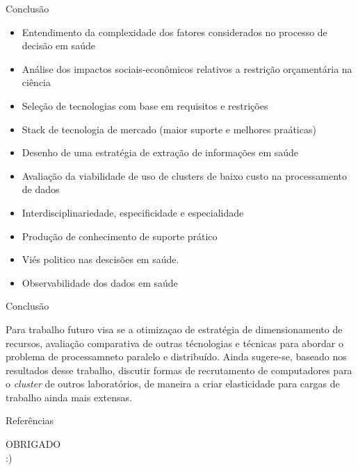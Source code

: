 \documentclass[10pt,brazil]{beamer}
\theoremstyle{definition}
\begin{document}
\begin{frame}{Conclusão}
  \begin{itemize}
    \item Entendimento da complexidade dos fatores considerados no processo de decisão em saúde
    \item Análise dos impactos sociais-econômicos relativos a restrição orçamentária na ciência
    \item Seleção de tecnologias com base em requisitos e restrições
    \item Stack de tecnologia de mercado (maior suporte e melhores praáticas)
    \item Desenho de uma estratégia de extração de informações em saúde
    \item Avaliação da viabilidade de uso de clusters de baixo custo na processamento de dados
    \item Interdisciplinariedade, especificidade e especialidade
    \item Produção de conhecimento de suporte prático 
    \item Viés politico nas descisões em saúde. 
    \item Observabilidade dos dados em saúde
  \end{itemize}
\end{frame}
\begin{frame}{Conclusão}
  
  Para trabalho futuro visa se a otimizaçao de estratégia de dimensionamento de recursos, avaliação comparativa de outras técnologias e técnicas para abordar o problema de processamneto paralelo e distribuído.
  Ainda sugere-se, baseado nos resultados desse trabalho, discutir formas de recrutamento de computadores para o \emph{cluster} de outros laboratórios, de maneira a criar elasticidade para cargas de trabalho ainda mais extensas.
\end{frame}


\begin{frame}[allowframebreaks]{Referências}
  \small
  
\end{frame}


\begin{frame}
  \centering
  {\color{ros} OBRIGADO\\
    :)}
\end{frame}
\end{document}
